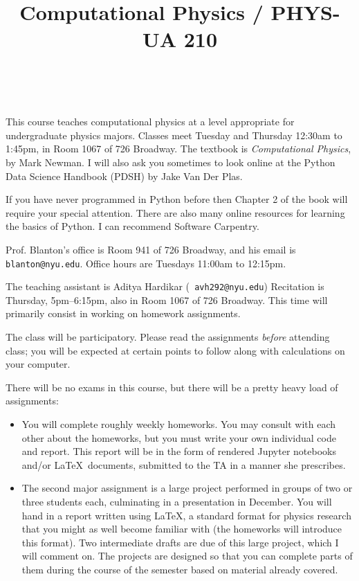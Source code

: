 \documentclass[11pt, preprint]{aastex}
\begin{document}
\title{\bf Computational Physics / PHYS-UA 210}
~
~

\noindent This course teaches computational physics at a level
appropriate for undergraduate physics majors.  Classes meet Tuesday
and Thursday 12:30am to 1:45pm, in Room 1067 of 726 Broadway.  The
textbook is {\it Computational Physics}, by Mark Newman. I will also
ask you sometimes to look online at the Python Data Science Handbook
(PDSH) by Jake Van Der Plas.

\noindent If you have never programmed in Python before then Chapter 2
of the book will require your special attention. There are also many
online resources for learning the basics of Python. I can recommend
Software Carpentry.

\noindent Prof. Blanton's office is Room 941 of 726 Broadway, and his
email is {\tt blanton@nyu.edu}.  Office hours are Tuesdays 11:00am to
12:15pm.

\noindent The teaching assistant is Aditya Hardikar ({\tt
  avh292@nyu.edu}) Recitation is Thursday, 5pm--6:15pm, also in Room
1067 of 726 Broadway. This time will primarily consist in working on
homework assignments.

\noindent The class will be participatory. Please read the assignments
          {\it before} attending class; you will be expected at
          certain points to follow along with calculations on your
          computer.

\noindent There will be no exams in this course, but there will be a
pretty heavy load of assignments:
\begin{itemize}
\item You will complete roughly weekly homeworks. You may consult with
  each other about the homeworks, but you must write your own
  individual code and report. This report will be in the form of
  rendered Jupyter notebooks and/or \LaTeX\ documents, submitted to
  the TA in a manner she prescribes.
\item The second major assignment is a large project performed in
  groups of two or three students each, culminating in a presentation
  in December. You will hand in a report written using \LaTeX, a
  standard format for physics research that you might as well become
  familiar with (the homeworks will introduce this format). Two
  intermediate drafts are due of this large project, which I will
  comment on. The projects are designed so that you can complete parts
  of them during the course of the semester based on
  material already covered. 
\end{itemize}
\end{document}
